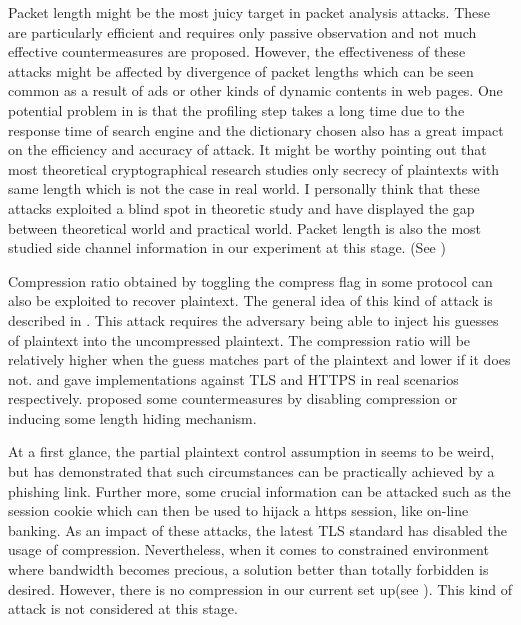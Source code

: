 Packet length might be the most juicy target in packet analysis attacks. These are particularly efficient and requires only passive observation and not much effective countermeasures are proposed. However, the effectiveness of these attacks might be affected by divergence of packet lengths which can be seen common as a result of ads or other kinds of dynamic contents in web pages. One potential problem in \cite{DBLP:journals/iacr/SchaubSHCJTHGR14} is that the profiling step takes a long time due to the response time of search engine and the dictionary chosen also has a great impact on the efficiency and accuracy of attack. It might be worthy pointing out that most theoretical cryptographical research studies only secrecy of plaintexts with same length which is not the case in real world. I personally think that these attacks exploited a blind spot in theoretic study and have displayed the gap between theoretical world and practical world. Packet length is also the most studied side channel information in our experiment at this stage. (See )

Compression ratio obtained by toggling the compress flag in some protocol can also be exploited to recover plaintext. The general idea of this kind of attack is described in \cite{DBLP:conf/fse/Kelsey02}. This attack requires the adversary being able to inject his guesses of plaintext into the uncompressed plaintext. The compression ratio will be relatively higher when the guess matches part of the plaintext and lower if it does not. \cite{CRIME} and \cite{BREACH} gave implementations against TLS and HTTPS in real scenarios respectively. \cite{DBLP:journals/iacr/AlawatugodaSB14a} proposed some countermeasures by disabling compression or inducing some length hiding mechanism.

At a first glance, the partial plaintext control assumption in \cite{DBLP:conf/fse/Kelsey02} seems to be weird, but \cite{BREACH} has demonstrated that such circumstances can be practically achieved by a phishing link. Further more, some crucial information can be attacked such as the session cookie which can then be used to hijack a https session, like on-line banking. As an impact of these attacks, the latest TLS standard has disabled the usage of compression. Nevertheless, when it comes to constrained environment where bandwidth becomes precious, a solution better than totally forbidden is desired. However, there is no compression in our current set up(see ). This kind of attack is not considered at this stage.

